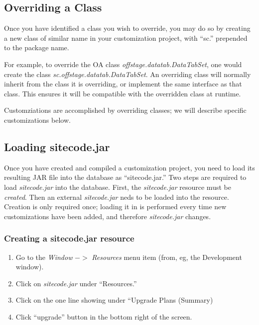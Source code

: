 \documentclass[11pt]{article}
\begin{document}
\subsection{Overriding a Class}

Once you have identified a class you wish to override, you may do so by creating a new class of similar name in your customization project, with ``sc.'' prepended to the package name.

For example, to override the OA class \emph{offstage.datatab.DataTabSet}, one would create the class \emph{sc.offstage.datatab.DataTabSet}.  An overriding class will normally inherit from the class it is overriding, or implement the same interface as that class.  This ensures it will be compatible with the overridden class at runtime.

Customziations are accomplished by overriding classes; we will describe specific customizations below.

\subsection{Loading sitecode.jar}

Once you have created and compiled a customization project, you need to load its resulting JAR file into the database as ``sitecode.jar.''  Two steps are required to load \emph{sitecode.jar} into the database.  First, the \emph{sitecode.jar} resource must be \emph{created}.  Then an external \emph{sitecode.jar} neds to be loaded into the resource.  Creation is only required once; loading it in is performed every time new customizations have been added, and therefore \emph{sitecode.jar} changes.

\subsubsection{Creating a sitecode.jar resource}

\begin{enumerate}
\item Go to the \emph{Window} $->$ \emph{Resources} menu item (from, eg, the Development window).
 \item Click on \emph{sitecode.jar} under ``Resources.''

\item Click on the one line showing under ``Upgrade Plans (Summary)

\item Click ``upgrade'' button in the bottom right of the screen.

\end{enumerate}
\end{document}
